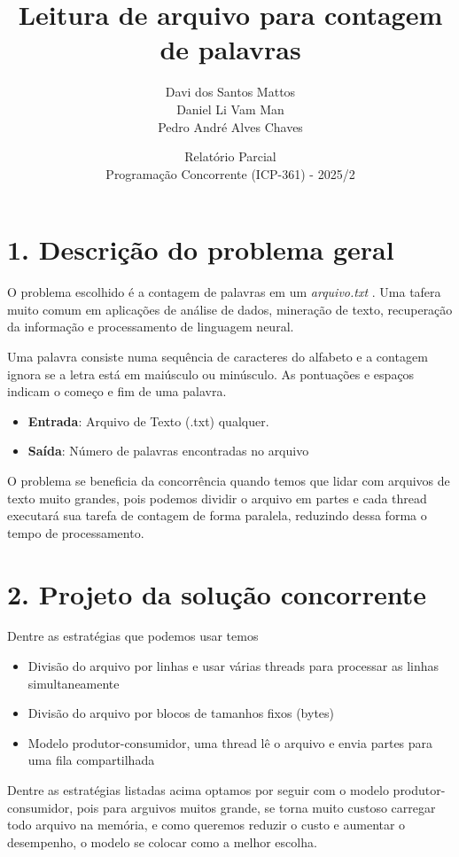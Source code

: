 \documentclass{article}
\title{Leitura de arquivo para contagem de palavras}
\author{Davi dos Santos Mattos \\
        Daniel Li Vam Man \\
        Pedro André Alves Chaves}
\date{Relatório Parcial \\ Programação Concorrente (ICP-361) - 2025/2}
\begin{document}
\maketitle

\section*{1. Descrição do problema geral}

O problema escolhido é a contagem de palavras em um \textit{arquivo.txt} . Uma tafera muito comum em aplicações de análise de dados, mineração de texto, recuperação da informação e processamento de linguagem neural.

Uma palavra consiste numa sequência de caracteres do alfabeto e a contagem ignora se a letra está em maiúsculo ou minúsculo. As pontuações e espaços indicam o começo e fim de uma palavra.
\begin{itemize}
    \item \textbf{Entrada}: Arquivo de Texto (.txt) qualquer.
    \item \textbf{Saída}: Número de palavras encontradas no arquivo
\end{itemize}

O problema se beneficia da concorrência quando temos que lidar com arquivos de texto muito grandes, pois podemos dividir o arquivo em partes e cada thread executará sua tarefa de contagem de forma paralela, reduzindo dessa forma o tempo de processamento.
    

\section*{2. Projeto da solução concorrente}

Dentre as estratégias que podemos usar temos
\begin{itemize}
    \item Divisão do arquivo por linhas e usar várias threads para processar as linhas simultaneamente 
    \item Divisão do arquivo por blocos de tamanhos fixos (bytes)
    \item Modelo produtor-consumidor, uma thread lê o arquivo e envia partes para uma fila compartilhada
\end{itemize}

Dentre as estratégias listadas acima optamos por seguir com o modelo produtor-consumidor, pois para arguivos muitos grande, se torna muito custoso carregar todo arquivo na memória, e como queremos reduzir o custo e aumentar o desempenho, o modelo se colocar como a melhor escolha. 
\end{document}
